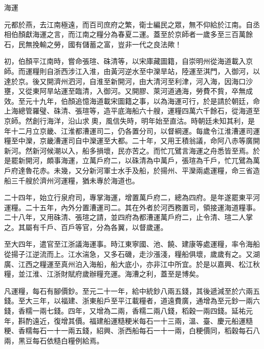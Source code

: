 \begin{pinyinscope}
 海運



 元都於燕，去江南極遠，而百司庶府之繁，衛士編民之眾，無不仰給於江南。自丞相伯顏獻海運之言，而江南之糧分為春夏二運。蓋至於京師者一歲多至三百萬餘石，民無挽輸之勞，國有儲蓄之富，豈非一代之良法歟！



 初，伯顏平江南時，嘗命張瑄、硃清等，以宋庫藏圖籍，自崇明州從海道載入京師。而運糧則自浙西涉江入淮，由黃河逆水至中灤旱站，陸運至淇門，入御河，以達於京。後又開濟州泗河，自淮至新開河，由大清河至利津，河入海，因海口沙壅，又從東阿旱站運至臨清，入御河。又開膠、萊河道通海，勞費不貲，卒無成效。至元十九年，伯顏追憶海道載宋圖籍之事，以為海運可行，於是請於朝廷，命上海總管羅璧、硃清、張瑄等，造平底海船六十艘，運糧四萬六千餘石，從海道至京師。然創行海洋，沿山求奧，風信失時，明年始至直沽。時朝廷未知其利，是年十二月立京畿、江淮都漕運司二，仍各置分司，以督綱運。每歲令江淮漕運司運糧至中灤，京畿漕運司自中灤運至大都。二十年，又用王積翁議，命阿八赤等廣開新河。然新河候潮以入，船多損壞，民亦苦之。而忙兀鷿言海運之舟悉皆至焉。於是罷新開河，頗事海運，立萬戶府二，以硃清為中萬戶，張瑄為千戶，忙兀鷿為萬戶府達魯花赤。未幾，又分新河軍士水手及船，於揚州、平灤兩處運糧，命三省造船三千艘於濟州河運糧，猶未專於海道也。



 二十四年，始立行泉府司，專掌海運，增置萬戶府二，總為四府。是年遂罷東平河運糧。二十五年，內外分置漕運司二。其在外者於河西務置司，領接運海道糧事。二十八年，又用硃清、張瑄之請，並四府為都漕運萬戶府二，止令清、瑄二人掌之。其屬有千戶、百戶等官，分為各翼，以督歲運。



 至大四年，遣官至江浙議海運事。時江東寧國、池、饒、建康等處運糧，率令海船從揚子江逆流而上。江水湍急，又多石磯，走沙漲淺，糧船俱壞，歲歲有之。又湖廣、江西之糧運至真州泊入海船，船大底小，亦非江中所宜。於是以嘉興、松江秋糧，並江淮、江浙財賦府歲辦糧充運。海漕之利，蓋至是博矣。



 凡運糧，每石有腳價鈔。至元二十一年，給中統鈔八兩五錢，其後遞減至於六兩五錢。至大三年，以福建、浙東船戶至平江載糧者，道遠費廣，通增為至元鈔一兩六錢，香糯一兩七錢。四年，又增為二兩，香糯二兩八錢，稻穀一兩四錢。延祐元年，斟酌遠近，復增其價。福建船運糙粳米每石一十三兩，溫、臺、慶元船運糙粳、香糯每石一十一兩五錢，紹興、浙西船每石一十一兩，白粳價同，稻穀每石八兩，黑豆每石依糙白糧例給焉。




\end{pinyinscope}
